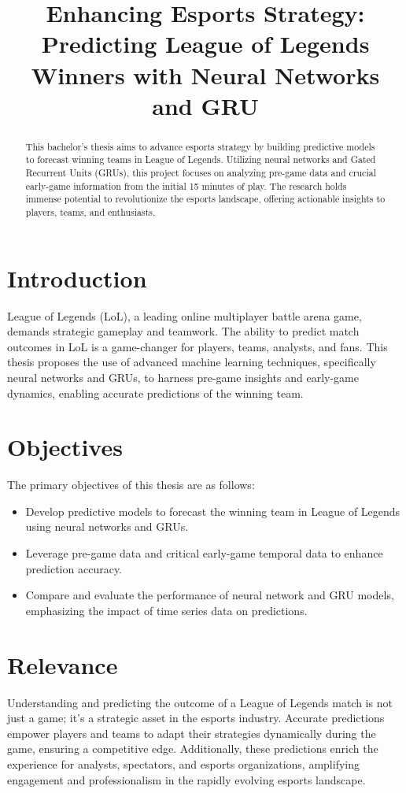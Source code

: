\documentclass{article}
\title{Enhancing Esports Strategy: Predicting League of Legends Winners with Neural Networks and GRU}
\author{}
\date{}
\begin{document}
\maketitle

\begin{abstract}
This bachelor's thesis aims to advance esports strategy by building predictive models to forecast winning teams in League of Legends. Utilizing neural networks and Gated Recurrent Units (GRUs), this project focuses on analyzing pre-game data and crucial early-game information from the initial 15 minutes of play. The research holds immense potential to revolutionize the esports landscape, offering actionable insights to players, teams, and enthusiasts.
\end{abstract}

\section{Introduction}
League of Legends (LoL), a leading online multiplayer battle arena game, demands strategic gameplay and teamwork. The ability to predict match outcomes in LoL is a game-changer for players, teams, analysts, and fans. This thesis proposes the use of advanced machine learning techniques, specifically neural networks and GRUs, to harness pre-game insights and early-game dynamics, enabling accurate predictions of the winning team.

\section{Objectives}
The primary objectives of this thesis are as follows:
\begin{itemize}
  \item Develop predictive models to forecast the winning team in League of Legends using neural networks and GRUs.
  \item Leverage pre-game data and critical early-game temporal data to enhance prediction accuracy.
  \item Compare and evaluate the performance of neural network and GRU models, emphasizing the impact of time series data on predictions.
\end{itemize}

\section{Relevance}
Understanding and predicting the outcome of a League of Legends match is not just a game; it's a strategic asset in the esports industry. Accurate predictions empower players and teams to adapt their strategies dynamically during the game, ensuring a competitive edge. Additionally, these predictions enrich the experience for analysts, spectators, and esports organizations, amplifying engagement and professionalism in the rapidly evolving esports landscape.
\end{document}
